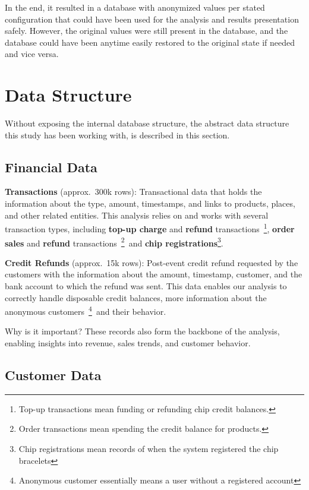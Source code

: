 In the end, it resulted in a database with anonymized values per stated configuration that could have been used for the analysis and results presentation safely.
However, the original values were still present in the database, and the database could have been anytime easily restored to the original state if needed and vice versa.


\section{Data Structure}
\label{sec:data-methodology-structure}
Without exposing the internal database structure, the abstract data structure this study has been working with, is described in this section.

\subsection{Financial Data}
\label{subsec:data-methodology-structure-financial}
\textbf{Transactions} (approx.\ 300k rows): Transactional data that holds the information about the type, amount, timestamps, and links to products, places, and other related entities.
This analysis relies on and works with several transaction types, including \textbf{top-up charge} and \textbf{refund} transactions~\footnote{Top-up transactions mean funding or refunding chip credit balances.},
\textbf{order sales} and \textbf{refund} transactions~\footnote{Order transactions mean spending the credit balance for products.}~and
\textbf{chip registrations}\footnote{Chip registrations mean records of when the system registered the chip bracelets}.

\textbf{Credit Refunds} (approx.\ 15k rows): Post-event credit refund requested by the customers with the information about the amount, timestamp, customer, and the bank account to which the refund was sent.
This data enables our analysis to correctly handle disposable credit balances, more information about the anonymous customers~\footnote{Anonymous customer essentially means a user without a registered account}~and their behavior.

\begin{blue-box}{Why is it important?}
	These records also form the backbone of the analysis, enabling insights into revenue, sales trends, and customer behavior.
\end{blue-box}

\subsection{Customer Data}
\label{subsec:data-methodology-structure-customer}

